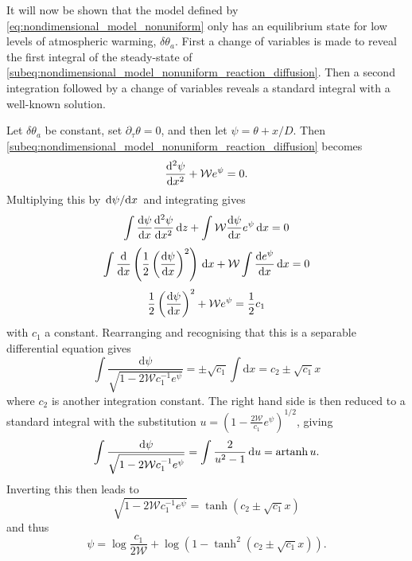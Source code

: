 It will now be shown that the model defined by \cref{eq:nondimensional_model_nonuniform} only has an equilibrium state for low levels of atmospheric warming, $\delta\theta_a$.
First a change of variables is made to reveal the first integral of the steady-state of 
\cref{subeq:nondimensional_model_nonuniform_reaction_diffusion}. Then a second integration followed by a change of variables reveals a standard integral with a
well-known solution.

Let $\delta\theta_a$ be constant, set $\partial_{\tau}\theta = 0$, and then let $\psi = \theta + x/D$. Then \cref{subeq:nondimensional_model_nonuniform_reaction_diffusion} becomes
\begin{equation}
  \dv[2]{\psi}{x} + \mathcal{W}e^{\psi} = 0.
\end{equation}
Multiplying this by $\dv*{\psi}{x}$ and integrating gives
\begin{equation}
  \int\dv{\psi}{x}\dv[2]{\psi}{x}\,\mathrm{d}z + \int\mathcal{W}\dv{\psi}{x}e^\psi\,\mathrm{d}{x} = 0
\end{equation}
\begin{equation}
  \int \dv{x}\left(\frac{1}{2}\left(\dv{\psi}{x}\right)^2\right)\,\mathrm{d}x + \mathcal{W} \int \dv{e^{\psi}}{x} \, \mathrm{d}x = 0
\end{equation}
\begin{equation}
  \frac{1}{2} \left(\dv{\psi}{x}\right)^2 + \mathcal{W}e^{\psi} = \frac{1}{2} c_1
\end{equation}
with $c_1$ a constant.
Rearranging and recognising that this is a separable differential equation gives
\begin{equation}
  \int \frac{\mathrm{d}\psi}{\sqrt{1 - 2\mathcal{W}c_1^{-1} e^{\psi}}} = \pm\sqrt{c_1} \int \mathrm{d}x = c_2 \pm \sqrt{c_1} x 
\end{equation}
where $c_2$ is another integration constant. The right hand side is then reduced to a standard integral\cite{riley2006}
with the substitution $u = \left(1 - \frac{2\mathcal{W}}{c_1} e^{\psi}\right)^{1/2}$, giving
\begin{equation}
  \int \frac{\mathrm{d}\psi}{\sqrt{1 - 2\mathcal{W}c_1^{-1} e^{\psi}}} = \int \frac{2}{u^2 - 1} \,\mathrm{d}u = \operatorname{artanh} u. 
\end{equation}
Inverting this then leads to
\begin{equation}
  \sqrt{1 - 2\mathcal{W}c_1^{-1} e^{\psi}} = \tanh\left(c_2 \pm \sqrt{c_1} x\right)
\end{equation}
and thus
\begin{equation}
  \psi = \log \frac{c_1}{2\mathcal{W}} + \log \left(1 - \tanh^2 \left(c_2 \pm \sqrt{c_1} x\right)\right).
\end{equation}
